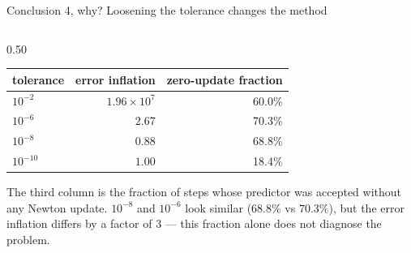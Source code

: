 \documentclass[aspectratio=169,10pt]{beamer}
\begin{document}
\begin{frame}{Conclusion 4, why?  Loosening the tolerance changes the method}
  \begin{columns}[T]
    \begin{column}{0.50\textwidth}
      {\footnotesize
      \setlength{\tabcolsep}{5pt}%
      \begin{tabular}{@{}lrr@{}}
        \toprule
        tolerance & error inflation & zero-update fraction \\
        \midrule
        $10^{-2}$  & $1.96\times10^{7}$ & 60.0\% \\
        $10^{-6}$  & $\mathbf{2.67}$    & 70.3\% \\
        $10^{-8}$  & $0.88$             & 68.8\% \\
        $10^{-10}$ & $1.00$             & 18.4\% \\
        \bottomrule
      \end{tabular}}
      \vspace{0.35em}

      \footnotesize
      The third column is the fraction of steps whose predictor was accepted
      without any Newton update.  $10^{-8}$ and $10^{-6}$ look similar
      ($68.8\%$ vs $70.3\%$), but the error inflation differs by a factor of
      $3$ --- \alert{this fraction alone does not diagnose the problem}.


\end{column}
\end{columns}
\end{frame}
\end{document}
